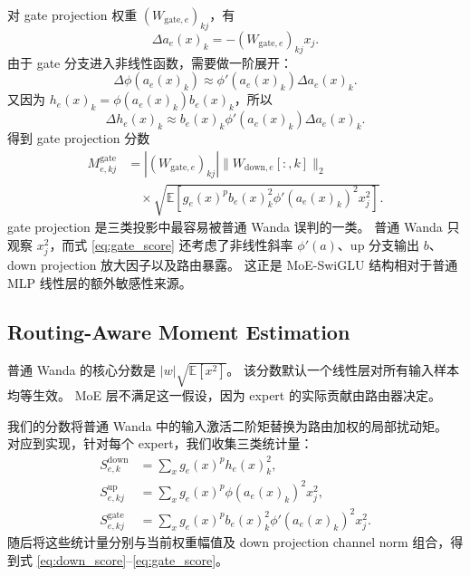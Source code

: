 \documentclass[letterpaper]{article}
\begin{document}
对 gate projection 权重 $(W_{\mathrm{gate},e})_{kj}$，有
\begin{equation}
    \Delta a_e(x)_k
    =
    -(W_{\mathrm{gate},e})_{kj}x_j.
\end{equation}
由于 gate 分支进入非线性函数，需要做一阶展开：
\begin{equation}
    \Delta \phi(a_e(x)_k)
    \approx
    \phi'(a_e(x)_k)\Delta a_e(x)_k.
\end{equation}
又因为 $h_e(x)_k=\phi(a_e(x)_k)b_e(x)_k$，所以
\begin{equation}
    \Delta h_e(x)_k
    \approx
    b_e(x)_k
    \phi'(a_e(x)_k)
    \Delta a_e(x)_k.
\end{equation}
得到 gate projection 分数
\begin{equation}
\begin{aligned}
    M^{\mathrm{gate}}_{e,kj}
    &=
    |(W_{\mathrm{gate},e})_{kj}|
    \|W_{\mathrm{down},e}[:,k]\|_2 \\
    &\quad \times
    \sqrt{
    \mathbb{E}\!\left[
        g_e(x)^p
        b_e(x)_k^2
        \phi'(a_e(x)_k)^2
        x_j^2
    \right]
    }.
\end{aligned}
\label{eq:gate_score}
\end{equation}
gate projection 是三类投影中最容易被普通 Wanda 误判的一类。
普通 Wanda 只观察 $x_j^2$，而式 \eqref{eq:gate_score} 还考虑了非线性斜率 $\phi'(a)$、up 分支输出 $b$、down projection 放大因子以及路由暴露。
这正是 MoE-SwiGLU 结构相对于普通 MLP 线性层的额外敏感性来源。

\subsection{Routing-Aware Moment Estimation}

普通 Wanda 的核心分数是 $|w|\sqrt{\mathbb{E}[x^2]}$。
该分数默认一个线性层对所有输入样本均等生效。
MoE 层不满足这一假设，因为 expert 的实际贡献由路由器决定。

我们的分数将普通 Wanda 中的输入激活二阶矩替换为路由加权的局部扰动矩。
对应到实现，针对每个 expert，我们收集三类统计量：
\begin{align}
    S^{\mathrm{down}}_{e,k}
    &=
    \sum_x g_e(x)^p h_e(x)_k^2, \\
    S^{\mathrm{up}}_{e,kj}
    &=
    \sum_x g_e(x)^p \phi(a_e(x)_k)^2 x_j^2, \\
    S^{\mathrm{gate}}_{e,kj}
    &=
    \sum_x g_e(x)^p b_e(x)_k^2 \phi'(a_e(x)_k)^2 x_j^2.
\end{align}
随后将这些统计量分别与当前权重幅值及 down projection channel norm 组合，得到式 \eqref{eq:down_score}--\eqref{eq:gate_score}。
\end{document}
